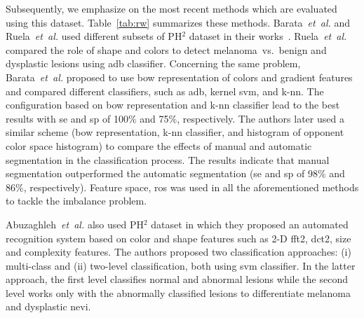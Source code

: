 Subsequently, we emphasize on the most recent methods which are evaluated using this dataset.
Table~\ref{tab:rw} summarizes these methods. 
Barata~\emph{et~al.}\cite{barata2013two,barata2013role} and Ruela~\emph{et~al.}\cite{ruela2013role,ruela2013color} used different subsets of PH$^{2}$ dataset in their works~\cite{mendoncca2013ph}.
Ruela~\emph{et~al.}\cite{ruela2013role,ruela2013color} compared the role of shape and colors to detect melanoma~vs.~benign and dysplastic lesions using \ac{adb} classifier.
Concerning the same problem, Barata~\emph{et~al.}\cite{barata2013two} proposed to use \ac{bow} representation of colors and gradient features and compared different classifiers, such as \ac{adb}, kernel \ac{svm}, and k-\ac{nn}.
The configuration based on \ac{bow} representation and k-\ac{nn} classifier lead to the best results with \ac{se} and \ac{sp} of 100\% and 75\%, respectively.
The authors later used a similar scheme (\ac{bow} representation, k-\ac{nn} classifier, and histogram of opponent color space histogram) to compare the effects of manual and automatic segmentation in the classification process.
The results indicate that manual segmentation outperformed the automatic segmentation (\ac{se} and \ac{sp} of 98\% and 86\%, respectively).
Feature space, \ac{ros} was used in all the aforementioned methods to tackle the imbalance problem.

Abuzaghleh~\emph{et~al.}\cite{abuzaghleh2014automated} also used PH$^{2}$ dataset in which they proposed an automated recognition system based on color and shape features such as 2-D \ac{fft2}, \ac{dct2}, size and complexity features.
The authors proposed two classification approaches: (i) multi-class and (ii) two-level classification, both using \ac{svm} classifier.
In the latter approach, the first level classifies normal and abnormal lesions while the second level works only with the abnormally classified lesions to differentiate melanoma and dysplastic nevi.

